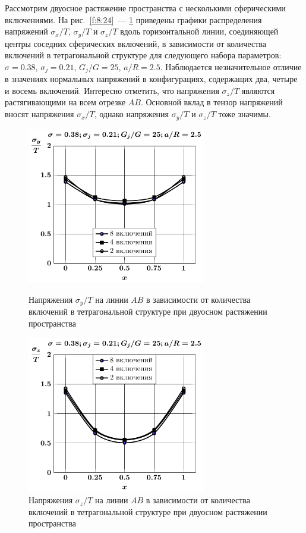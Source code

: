 
Рассмотрим двуосное растяжение пространства с несколькими сферическими включениями. На рис.~\ref{f:8:24}~--- \ref{f:8:26} приведены графики распределения напряжений $\sigma_x/T$, $\sigma_y/T$ и $\sigma_z/T$ вдоль горизонтальной  линии, соединяющей центры соседних сферических включений, в зависимости от количества включений в тетрагональной структуре для следующего набора параметров: $\sigma=0.38$, $\sigma_j=0.21$, $G_j/G=25$, $a/R=2.5$. Наблюдается незначительное отличие в значениях нормальных напряжений в конфигурациях, содержащих два, четыре и восемь включений. Интересно отметить, что напряжения $\sigma_z/T$ являются растягивающими на всем отрезке $AB$. Основной вклад в тензор напряжений вносят напряжения $\sigma_x/T$, однако напряжения $\sigma_y/T$ и $\sigma_z/T$ тоже значимы.

\begin{figure}[h!]
\centering\footnotesize
\parbox[b]{7.5cm}{\centering\includegraphics[width=7.8cm]{inc8-4-2-a25-d95-g25-sig_y-spheres-tension2.pdf}
\caption{Напряжения $\sigma_y/T$ на линии $AB$ в зависимости от количества включений в тетрагональной структуре при двуосном растяжении пространства
\label{f:8:25}}}\hfil\hfil
\parbox[b]{7.5cm}{\centering\includegraphics[width=7.8cm]{inc8-4-2-a25-d95-g25-sig_z-spheres-tension2.pdf}
\caption{Напряжения $\sigma_z/T$ на линии $AB$ в зависимости от количества включений в тетрагональной структуре при двуосном растяжении пространства
\label{f:8:26}}}
\end{figure}

